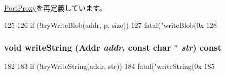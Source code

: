 \hyperlink{classPortProxy_af68c0d93cdb9ff9c4df789c4c9029709}{PortProxy}を再定義しています。


\begin{DoxyCode}
125 {
126     if (!tryWriteBlob(addr, p, size))
127         fatal("writeBlob(0x%
128 }
\end{DoxyCode}
\hypertarget{classSETranslatingPortProxy_a6b750ce66a82c7f9576c4fcde9bb7f54}{
\subsubsection[{writeString}]{\setlength{\rightskip}{0pt plus 5cm}void writeString ({\bf Addr} {\em addr}, \/  const char $\ast$ {\em str}) const}}
\label{classSETranslatingPortProxy_a6b750ce66a82c7f9576c4fcde9bb7f54}



\begin{DoxyCode}
182 {
183     if (!tryWriteString(addr, str))
184         fatal("writeString(0x%
185 }
\end{DoxyCode}


